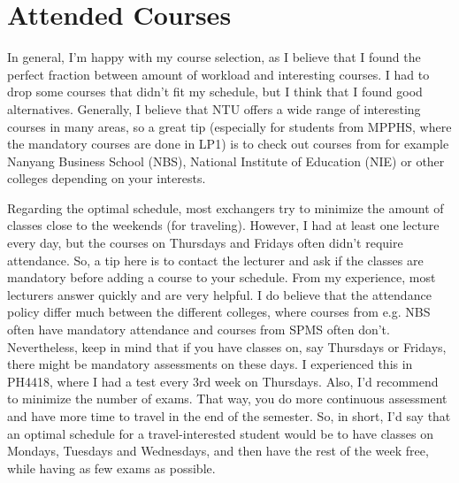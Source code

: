 \chapter*{Attended Courses}
In general, I'm happy with my course selection, as I believe that I found the perfect fraction between amount of workload and interesting courses. I had to drop some courses that didn't fit my schedule, but I think that I found good alternatives. Generally, I believe that NTU offers a wide range of interesting courses in many areas, so a great tip (especially for students from MPPHS, where the mandatory courses are done in LP1) is to check out courses from for example Nanyang Business School (NBS), National Institute of Education (NIE) or other colleges depending on your interests. 

Regarding the optimal schedule, most exchangers try to minimize the amount of classes close to the weekends (for traveling). However, I had at least one lecture every day, but the courses on Thursdays and Fridays often didn't require attendance. So, a tip here is to contact the lecturer and ask if the classes are mandatory before adding a course to your schedule. From my experience, most lecturers answer quickly and are very helpful. I do believe that the attendance policy differ much between the different colleges, where courses from e.g. NBS often have mandatory attendance and courses from SPMS often don't. Nevertheless, keep in mind that if you have classes on, say Thursdays or Fridays, there might be mandatory assessments on these days. I experienced this in PH4418, where I had a test every 3rd week on Thursdays. Also, I'd recommend to minimize the number of exams. That way, you do more continuous assessment and have more time to travel in the end of the semester. So, in short, I'd say that an optimal schedule for a travel-interested student would be to have classes on Mondays, Tuesdays and Wednesdays, and then have the rest of the week free, while having as few exams as possible.

